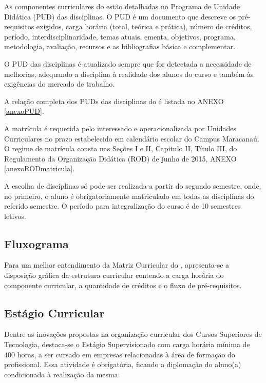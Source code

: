 As componentes curriculares do \NOMECURSO estão detalhadas no Programa de Unidade Didática (PUD) das disciplinas. O PUD é um documento que descreve os pré-requisitos exigidos, carga horária (total, teórica e prática), número de créditos, período, interdisciplinaridade, temas atuais, ementa, objetivos, programa, metodologia, avaliação, recursos e as bibliografias básica e complementar.

O PUD das disciplinas é atualizado sempre que for detectada a necessidade de melhorias, adequando a disciplina à realidade dos alunos do curso e também às exigências do mercado de trabalho.

A relação completa dos PUDs das disciplinas do \NOMECURSO é listada no ANEXO \ref{anexoPUD}.


A matrícula é requerida pelo interessado e operacionalizada por Unidades Curriculares no prazo estabelecido em calendário escolar do Campus Maracanaú. O regime de matrícula consta nas Seções I e II, Capitulo II, Título III, do Regulamento da Organização Didática (ROD) de junho de 2015, ANEXO \ref{anexoRODmatricula}.

A escolha de disciplinas só pode ser realizada a partir do segundo semestre, onde, no primeiro, o aluno é obrigatoriamente matriculado em todas as disciplinas do referido semestre. O período para integralização do curso é de 10 semestres letivos.

\clearpage

\subsection{Fluxograma}
Para um melhor entendimento da Matriz Curricular do \NOMECURSO, apresenta-se a disposição gráfica da estrutura curricular contendo a carga horária do componente curricular, a quantidade de créditos e o fluxo de pré-requisitos.



\subsection{Estágio Curricular}

Dentre as inovações propostas na organização curricular dos Cursos Superiores de Tecnologia, destaca-se o Estágio Supervisionado com carga horária mínima de 400 horas, a ser cursado em empresas relacionadas à área de formação do profissional. Essa atividade é obrigatória, ficando a diplomação do aluno(a) condicionada à realização da mesma.

